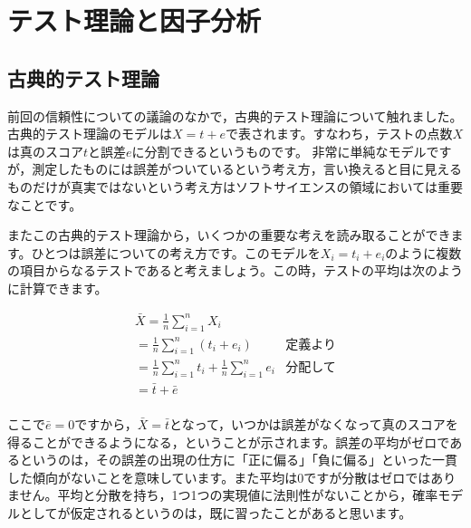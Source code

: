 \documentclass{ltjsbook}
\begin{document}
 
\chapter{テスト理論と因子分析} 
\label{chapter3} 

\section{古典的テスト理論}
前回の信頼性についての議論のなかで，古典的テスト理論について触れました。古典的テスト理論のモデルは$X=t+e$で表されます。すなわち，テストの点数$X$は真のスコア$t$と誤差$e$に分割できるというものです。
非常に単純なモデルですが，測定したものには誤差がついているという考え方，言い換えると目に見えるものだけが真実ではないという考え方はソフトサイエンスの領域においては重要なことです。

またこの古典的テスト理論から，いくつかの重要な考えを読み取ることができます。ひとつは誤差についての考え方です。このモデルを$X_i = t_i + e_i$のように複数の項目からなるテストであると考えましょう。この時，テストの平均は次のように計算できます。

\begin{align*}
    &       \bar{X}  =  \frac{1}{n}\sum_{i=1}^n X_i  & &\mbox{}\\
    &                    =  \frac{1}{n}\sum_{i=1}^n (t_i + e_i) &\mbox{定義より}\\
    &                     =  \frac{1}{n} \sum_{i=1}^n  t_i +  \frac{1}{n} \sum_{i=1}^n  e_i &\mbox{分配して}\\
    &                     =  \bar{t} + \bar{e} &\mbox{}\\
\end{align*}

ここで$\bar{e}=0$ですから，$\bar{X}=\bar{t}$となって，いつかは誤差がなくなって真のスコアを得ることができるようになる，ということが示されます。誤差の平均がゼロであるというのは，その誤差の出現の仕方に「正に偏る」「負に偏る」といった一貫した傾向がないことを意味しています。また平均は$0$ですが分散はゼロではありません。平均と分散を持ち，1つ1つの実現値に法則性がないことから，確率モデルとしてが仮定されるというのは，既に習ったことがあると思います。
\end{document}
